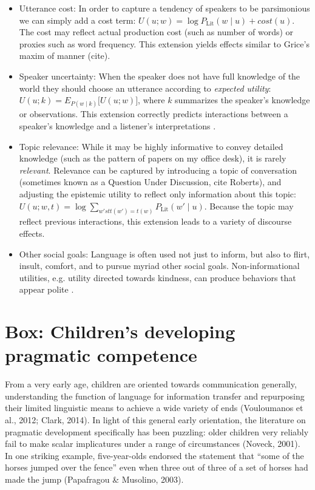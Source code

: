 \documentclass[]{elsarticle}
\begin{document}
\begin{itemize}
\item

  Utterance cost: In order to capture a tendency of speakers to be
  parsimonious we can simply add a cost term: $U(u; w) =
  \log P_{\text{Lit}}(w\mid u) + cost(u)$. The cost may
  reflect actual production cost (such as number of words) or proxies
  such as word frequency. This extension yields effects similar to
  Grice's maxim of manner (cite).

\item

  Speaker uncertainty: When the speaker does not have full knowledge of
  the world they should choose an utterance according to \emph{expected
  utility}: $U(u;k) = E_{P(w\mid k)}{[}U(u;w){]}$, where $k$
  summarizes the speaker's knowledge or observations. This extension
  correctly predicts interactions between a speaker's knowledge and a
  listener's interpretations
  \cite{goodmanstuhllmueler}.

\item

  Topic relevance: While it may be highly informative to convey detailed
  knowledge (such as the pattern of papers on my office desk), it is
  rarely \emph{relevant}. Relevance can be captured by introducing a
  topic of conversation (sometimes known as a Question Under Discussion,
  cite Roberts), and adjusting the epistemic utility to reflect only
  information about this topic: $U(u;w,t)=\log \sum_{w' st t(w')=t(w)} P_{\text{Lit}}(w'\mid u)$.
  Because the topic may reflect previous interactions, this extension
  leads to a variety of discourse effects.

\item

  Other social goals: Language is often used not just to inform, but
  also to flirt, insult, comfort, and to pursue myriad other social
  goals. Non-informational utilities, e.g. utility directed towards
  kindness, can produce behaviors that appear polite
  \cite{yoon}.

\end{itemize}

\section{Box: Children's developing pragmatic competence}\label{box-childrens-developing-pragmatic-competence.}

From a very early age, children are oriented towards communication
generally, understanding the function of language for information
transfer and repurposing their limited linguistic means to achieve a
wide variety of ends (Vouloumanos et al., 2012; Clark, 2014). In light
of this general early orientation, the literature on pragmatic
development specifically has been puzzling: older children very reliably
fail to make scalar implicatures under a range of circumstances (Noveck,
2001). In one striking example, five-year-olds endorsed the statement
that ``some of the horses jumped over the fence'' even when three out of
three of a set of horses had made the jump (Papafragou \& Musolino,
2003).
\end{document}
